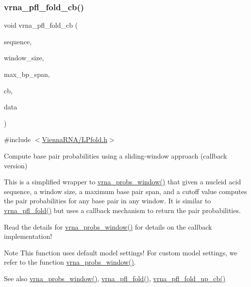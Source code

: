 \subsubsection{\texorpdfstring{vrna\+\_\+pfl\+\_\+fold\+\_\+cb()}{vrna\_pfl\_fold\_cb()}}
{\footnotesize\ttfamily void vrna\+\_\+pfl\+\_\+fold\+\_\+cb (\begin{DoxyParamCaption}\item[{const char $\ast$}]{sequence,  }\item[{int}]{window\+\_\+size,  }\item[{int}]{max\+\_\+bp\+\_\+span,  }\item[{\mbox{\hyperlink{_l_pfold_8h_abe710a1182e6db69cc75329dfc9bed67}{vrna\+\_\+probs\+\_\+window\+\_\+callback}} $\ast$}]{cb,  }\item[{void $\ast$}]{data }\end{DoxyParamCaption})}



{\ttfamily \#include $<$\mbox{\hyperlink{_l_pfold_8h}{Vienna\+R\+N\+A/\+L\+Pfold.\+h}}$>$}



Compute base pair probabilities using a sliding-\/window approach (callback version) 

This is a simplified wrapper to \mbox{\hyperlink{group__local__pf__fold_ga70ec33810fa17a9f67a7c59f156d0137}{vrna\+\_\+probs\+\_\+window()}} that given a nucleid acid sequence, a window size, a maximum base pair span, and a cutoff value computes the pair probabilities for any base pair in any window. It is similar to \mbox{\hyperlink{group__local__pf__fold_ga6267230f20cab0e2315375310b4dad85}{vrna\+\_\+pfl\+\_\+fold()}} but uses a callback mechanism to return the pair probabilities.

Read the details for \mbox{\hyperlink{group__local__pf__fold_ga70ec33810fa17a9f67a7c59f156d0137}{vrna\+\_\+probs\+\_\+window()}} for details on the callback implementation!

\begin{DoxyNote}{Note}
This function uses default model settings! For custom model settings, we refer to the function \mbox{\hyperlink{group__local__pf__fold_ga70ec33810fa17a9f67a7c59f156d0137}{vrna\+\_\+probs\+\_\+window()}}.
\end{DoxyNote}
\begin{DoxySeeAlso}{See also}
\mbox{\hyperlink{group__local__pf__fold_ga70ec33810fa17a9f67a7c59f156d0137}{vrna\+\_\+probs\+\_\+window()}}, \mbox{\hyperlink{group__local__pf__fold_ga6267230f20cab0e2315375310b4dad85}{vrna\+\_\+pfl\+\_\+fold()}}, \mbox{\hyperlink{group__local__pf__fold_ga8958d91b1f1aebfb32b58805d141ccf3}{vrna\+\_\+pfl\+\_\+fold\+\_\+up\+\_\+cb()}}
\end{DoxySeeAlso}


